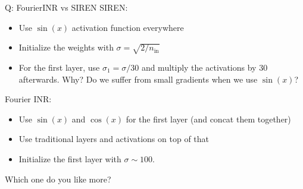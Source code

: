 \documentclass[10pt]{beamer}
\begin{document}
%

\begin{frame}{Q: FourierINR vs SIREN}
\pause
SIREN:
\begin{itemize}
    \item\pause Use $\sin(x)$ activation function everywhere
    \item\pause Initialize the weights with $\sigma = \sqrt{2/n_\text{in}}$
    \item\pause For the first layer, use $\sigma_1 = \sigma / 30$ and multiply the activations by 30 afterwards. Why? Do we suffer from small gradients when we use $\sin(x)$?
\end{itemize}

\pause 
Fourier INR:
\begin{itemize}
    \item\pause Use $\sin(x)$ and $\cos(x)$ for the first layer (and concat them together)
    \item\pause Use traditional layers and activations on top of that
    \item\pause Initialize the first layer with $\sigma \sim 100$.
\end{itemize}

Which one do you like more?
\end{frame}


\end{document}
